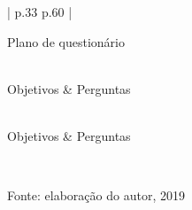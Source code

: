 \begin{refsection}
    \begin{longquadro}[t]{ | p{.33\textwidth} p{.60\textwidth} | }
        \caption{Plano de questionário}
        \label{quad:questionario}\\
       
        \hline
        Objetivos & \hspace{1.75em}Perguntas\\
        \hline
        \endfirsthead

        \\
        \hline
        Objetivos & \hspace{1.75em}Perguntas\\
        \hline
        \endhead

        \hline
        \\
        \endfoot
       
        \hline
        \caption*{Fonte: elaboração do autor, 2019}
        \endlastfoot
       

\end{longquadro}
\end{refsection}
